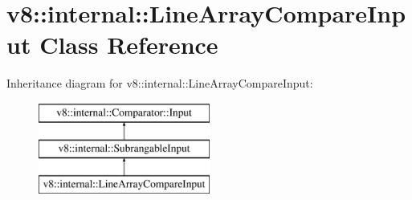 \hypertarget{classv8_1_1internal_1_1_line_array_compare_input}{}\section{v8\+:\+:internal\+:\+:Line\+Array\+Compare\+Input Class Reference}
\label{classv8_1_1internal_1_1_line_array_compare_input}
Inheritance diagram for v8\+:\+:internal\+:\+:Line\+Array\+Compare\+Input\+:\begin{figure}[H]
\begin{center}
\leavevmode
\includegraphics[height=3.000000cm]{classv8_1_1internal_1_1_line_array_compare_input}
\end{center}
\end{figure}
